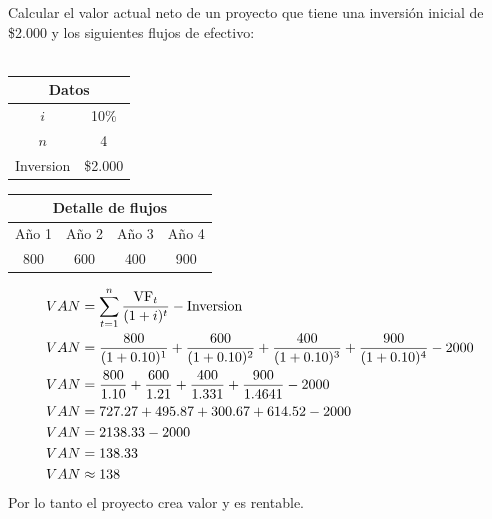 \documentclass{templateNote}
\begin{document}
\begin{tcolorbox}[colback=blue!10!white,colframe=blue!60!black,title=Ejemplo]
    \noindent Calcular el valor actual neto de un proyecto que tiene una inversión inicial de \$2.000 y los siguientes flujos de efectivo: \\\\
    \begin{minipage}{0.4\textwidth}
        \centering
        \begin{tabular}{|c|c|}
            \hline
            \multicolumn{2}{|c|}{\textbf{Datos}} \\ \hline
            $i$ & 10\% \\ \hline
            $n$ & 4 \\ \hline
            Inversion & \$2.000 \\ \hline
        \end{tabular}
    \end{minipage}
    \begin{minipage}{0.5\textwidth}
        \centering
        \begin{tabular}{|c|c|c|c|}
            \hline
            \multicolumn{4}{|c|}{\textbf{Detalle de flujos}} \\ \hline
            Año 1 & Año 2 & Año 3 & Año 4 \\ \hline
            800 & 600 & 400 & 900 \\ \hline
        \end{tabular}
    \end{minipage}

    \begin{align*}
        VAN &= \sum_{t=1}^{n} \frac{{\textnormal{VF}}_t}{(1 + i)^t} - \textnormal{Inversion}\\
        VAN &= \frac{800}{(1 + 0.10)^1} + \frac{600}{(1 + 0.10)^2} + \frac{400}{(1 + 0.10)^3} + \frac{900}{(1 + 0.10)^4} - 2000\\
        VAN &= \frac{800}{1.10} + \frac{600}{1.21} + \frac{400}{1.331} + \frac{900}{1.4641} - 2000\\
        VAN &= 727.27 + 495.87 + 300.67 + 614.52 - 2000\\
        VAN &= 2138.33 - 2000\\
        VAN &= 138.33 \\
        VAN &\approx 138
    \end{align*}
    \center Por lo tanto el proyecto crea valor y es rentable.
\end{tcolorbox}    
\end{document}
